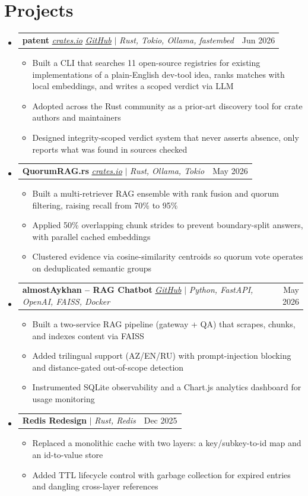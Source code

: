 \documentclass[letterpaper,11pt]{article}
\makeatletter
\newcommand{\resumeItem}[1]{
  \item\small{
    {#1 \vspace{-2pt}}
  }
}
\newcommand{\resumeProjectHeading}[2]{
    \item
    \begin{tabular*}{0.97\textwidth}{l@{\extracolsep{\fill}}r}
      \small#1 & #2 \\
    \end{tabular*}\vspace{-7pt}
}
\newcommand{\resumeSubHeadingListStart}{\begin{itemize}[leftmargin=0.15in, label={}]}
\newcommand{\resumeSubHeadingListEnd}{\end{itemize}}
\newcommand{\resumeItemListStart}{\begin{itemize}}
\newcommand{\resumeItemListEnd}{\end{itemize}\vspace{-5pt}}
\makeatother
\begin{document}
\section{Projects}
    \resumeSubHeadingListStart
      \resumeProjectHeading
        {\textbf{patent }{\href{https://crates.io/crates/patent}{\textit{crates.io}}} {\href{https://github.com/r14dd/patent}{\textit{GitHub}}} $|$ \emph{Rust, Tokio, Ollama, fastembed}}{Jun 2026}
          \resumeItemListStart
            \resumeItem{Built a CLI that searches 11 open-source registries for existing implementations of a plain-English dev-tool idea, ranks matches with local embeddings, and writes a scoped verdict via LLM}
            \resumeItem{Adopted across the Rust community as a prior-art discovery tool for crate authors and maintainers}
            \resumeItem{Designed integrity-scoped verdict system that never asserts absence, only reports what was found in sources checked}
          \resumeItemListEnd
      \resumeProjectHeading
        {\textbf{QuorumRAG.rs }{\href{https://crates.io/crates/quorumrag}{\textit{crates.io}}} $|$ \emph{Rust, Ollama, Tokio}}{May 2026}
          \resumeItemListStart
            \resumeItem{Built a multi-retriever RAG ensemble with rank fusion and quorum filtering, raising recall from 70\% to 95\%}
            \resumeItem{Applied 50\% overlapping chunk strides to prevent boundary-split answers, with parallel cached embeddings}
            \resumeItem{Clustered evidence via cosine-similarity centroids so quorum vote operates on deduplicated semantic groups}
          \resumeItemListEnd
      \resumeProjectHeading
        {\textbf{almostAykhan -- RAG Chatbot }{\href{https://github.com/r14dd/almostAykhan}{\textit{GitHub}}} $|$ \emph{Python, FastAPI, OpenAI, FAISS, Docker}}{May 2026}
          \resumeItemListStart
            \resumeItem{Built a two-service RAG pipeline (gateway + QA) that scrapes, chunks, and indexes content via FAISS}
            \resumeItem{Added trilingual support (AZ/EN/RU) with prompt-injection blocking and distance-gated out-of-scope detection}
            \resumeItem{Instrumented SQLite observability and a Chart.js analytics dashboard for usage monitoring}
          \resumeItemListEnd
      \resumeProjectHeading
        {\textbf{Redis Redesign} $|$ \emph{Rust, Redis}}{Dec 2025}
          \resumeItemListStart
            \resumeItem{Replaced a monolithic cache with two layers: a key/subkey-to-id map and an id-to-value store}
            \resumeItem{Added TTL lifecycle control with garbage collection for expired entries and dangling cross-layer references}
          \resumeItemListEnd
    \resumeSubHeadingListEnd
\end{document}
